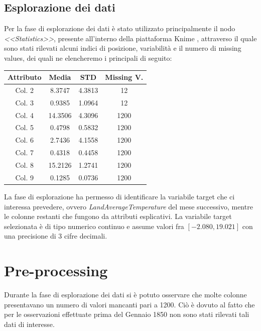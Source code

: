 \documentclass[12pt, a4paper, twocolumn]{article} %
\begin{document}
\subsection{Esplorazione dei dati}
Per la fase di esplorazione dei dati è stato utilizzato principalmente il nodo \textit{<<Statistics>>}, presente all'interno della piattaforma Knime \cite{knimewebsite}, attraverso il quale sono stati rilevati alcuni indici di posizione, variabilità e il numero di missing values, dei quali ne elencheremo i principali di seguito:
%
\begin{center}
\begin{tabular}{||c c c c||} 
 \hline
 Attributo  & Media & STD & Missing V. \\ [0.5ex] 
 \hline\hline
	Col. 2 &   8.3747 & 4.3813 & 12 \\
\hline\hline
	Col. 3 &   0.9385& 1.0964 & 12 \\
	\hline\hline
	Col. 4 & 14.3506 & 4.3096 & 1200 \\
	\hline\hline
	Col. 5 & 0.4798 & 0.5832 & 1200 \\
	\hline\hline
	Col. 6 &2.7436 & 4.1558 & 1200 \\
	\hline\hline
	Col. 7 & 0.4318 & 0.4458 & 1200 \\
	\hline\hline
	Col. 8 & 15.2126 & 1.2741 & 1200 \\
	\hline\hline
	Col. 9 & 0.1285 & 0.0736 & 1200 \\[0.5ex] \hline 
\end{tabular}
\end{center}

La fase di esplorazione ha permesso di identificare la variabile target che ci interessa prevedere, ovvero \textit{LandAverageTemperature} del mese successivo, mentre le colonne restanti che fungono da attributi esplicativi.
La variabile target selezionata è di tipo numerico continuo e assume valori fra $[-2.080, 19.021]$ con una precisione di 3 cifre decimali.

\section{Pre-processing}
Durante la fase di esplorazione dei dati si è potuto osservare che molte colonne presentavano un numero di valori mancanti pari a 1200. Ciò è dovuto al fatto che per le osservazioni effettuate prima del Gennaio 1850 non sono stati rilevati tali dati di interesse. 
\end{document}
